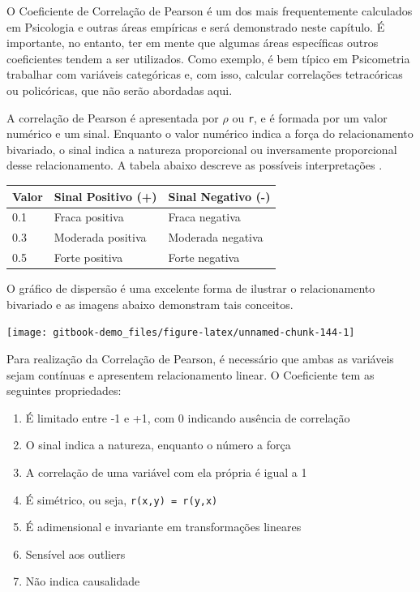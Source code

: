 \documentclass[
]{book}
\providecommand{\tightlist}{%
  \setlength{\itemsep}{0pt}\setlength{\parskip}{0pt}}
\begin{document}
O Coeficiente de Correlação de Pearson é um dos mais frequentemente calculados em Psicologia e outras áreas empíricas e será demonstrado neste capítulo. É importante, no entanto, ter em mente que algumas áreas específicas outros coeficientes tendem a ser utilizados. Como exemplo, é bem típico em Psicometria trabalhar com variáveis categóricas e, com isso, calcular correlações tetracóricas ou policóricas, que não serão abordadas aqui.

A correlação de Pearson é apresentada por \(\rho\) ou \texttt{r}, e é formada por um valor numérico e um sinal. Enquanto o valor numérico indica a força do relacionamento bivariado, o sinal indica a natureza proporcional ou inversamente proporcional desse relacionamento. A tabela abaixo descreve as possíveis interpretações \citep{Cohen1988}.

\begin{longtable}[]{@{}lll@{}}
\toprule
Valor & Sinal Positivo (+) & Sinal Negativo (-)\tabularnewline
\midrule
\endhead
0.1 & Fraca positiva & Fraca negativa\tabularnewline
0.3 & Moderada positiva & Moderada negativa\tabularnewline
0.5 & Forte positiva & Forte negativa\tabularnewline
\bottomrule
\end{longtable}

O gráfico de dispersão é uma excelente forma de ilustrar o relacionamento bivariado e as imagens abaixo demonstram tais conceitos.

\begin{center}\texttt{[image: gitbook-demo\_files/figure-latex/unnamed-chunk-144-1]} \end{center}

Para realização da Correlação de Pearson, é necessário que ambas as variáveis sejam contínuas e apresentem relacionamento linear. O Coeficiente tem as seguintes propriedades:

\begin{enumerate}
\def\labelenumi{\arabic{enumi}.}
\tightlist
\item
  É limitado entre -1 e +1, com 0 indicando ausência de correlação\\
\item
  O sinal indica a natureza, enquanto o número a força\\
\item
  A correlação de uma variável com ela própria é igual a 1\\
\item
  É simétrico, ou seja, \texttt{r(x,y)\ =\ r(y,x)}\\
\item
  É adimensional e invariante em transformações lineares\\
\item
  Sensível aos outliers\\
\item
  Não indica causalidade
\end{enumerate}
\end{document}
